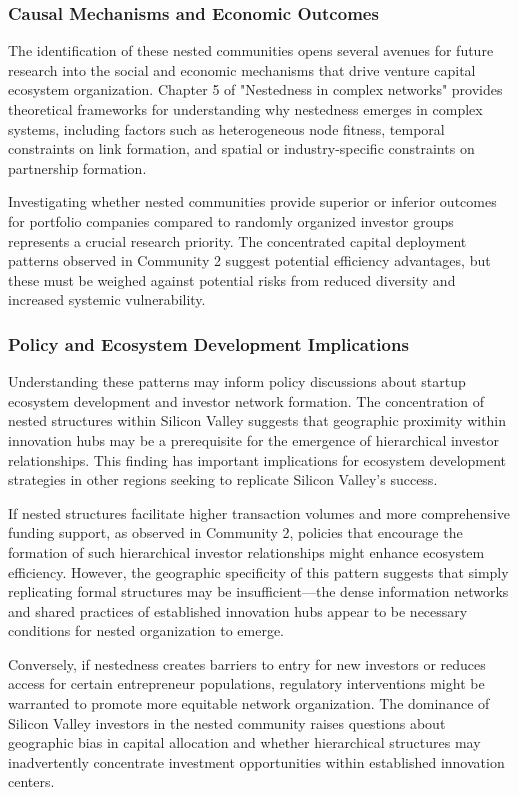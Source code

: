 \subsubsection{Causal Mechanisms and Economic Outcomes}

The identification of these nested communities opens several avenues for future research into the social and economic mechanisms that drive venture capital ecosystem organization. Chapter 5 of "Nestedness in complex networks" \cite{Mariani2019} provides theoretical frameworks for understanding why nestedness emerges in complex systems, including factors such as heterogeneous node fitness, temporal constraints on link formation, and spatial or industry-specific constraints on partnership formation.

Investigating whether nested communities provide superior or inferior outcomes for portfolio companies compared to randomly organized investor groups represents a crucial research priority. The concentrated capital deployment patterns observed in Community 2 suggest potential efficiency advantages, but these must be weighed against potential risks from reduced diversity and increased systemic vulnerability.

\subsubsection{Policy and Ecosystem Development Implications}

Understanding these patterns may inform policy discussions about startup ecosystem development and investor network formation. The concentration of nested structures within Silicon Valley suggests that geographic proximity within innovation hubs may be a prerequisite for the emergence of hierarchical investor relationships. This finding has important implications for ecosystem development strategies in other regions seeking to replicate Silicon Valley's success.

If nested structures facilitate higher transaction volumes and more comprehensive funding support, as observed in Community 2, policies that encourage the formation of such hierarchical investor relationships might enhance ecosystem efficiency. However, the geographic specificity of this pattern suggests that simply replicating formal structures may be insufficient—the dense information networks and shared practices of established innovation hubs appear to be necessary conditions for nested organization to emerge.

Conversely, if nestedness creates barriers to entry for new investors or reduces access for certain entrepreneur populations, regulatory interventions might be warranted to promote more equitable network organization. The dominance of Silicon Valley investors in the nested community raises questions about geographic bias in capital allocation and whether hierarchical structures may inadvertently concentrate investment opportunities within established innovation centers.

